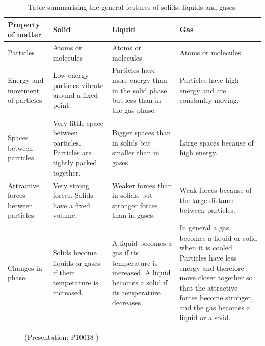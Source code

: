 \begin{table}[h]
\begin{center}
\caption{Table summarising the general features of solids, liquids and gases.}
\label{tab:microscopic:kinetic theory}
\begin{tabular}{|p{3cm}|p{3cm}|p{3cm}|p{3cm}|}\hline
\textbf{Property of matter} & \textbf{Solid} & \textbf{Liquid} & \textbf{Gas} \\\hline
Particles & Atoms or molecules & Atoms or molecules & Atoms or molecules \\\hline
Energy and movement of particles & Low energy - particles vibrate around a fixed point. & Particles have more energy than in the solid phase but less than in the gas phase. & Particles have high energy and are constantly moving.  \\\hline
Spaces between particles & Very little space between particles. Particles are tightly packed together. & Bigger spaces than in solids but smaller than in gases. & Large spaces because of high energy.  \\\hline
Attractive forces between particles. & Very strong forces. Solids have a fixed volume. & Weaker forces than in solids, but stronger forces than in gases. & Weak forces because of the large distance between particles.  \\\hline
Changes in phase. & Solids become liquids or gases if their temperature is increased. & A liquid becomes a gas if its temperature is increased. A liquid becomes a solid if its temperature decreases. & In general a gas becomes a liquid or solid when it is cooled. Particles have less energy and therefore move closer together so that the attractive forces become stronger, and the gas becomes a liquid or a solid.  \\\hline
\end{tabular}
\end{center}
\end{table}
    \par
    \setcounter{subfigure}{0}
	\begin{figure}[H] %
    \label{m38730*slidesharemedia}\label{m38730*slideshareflash} { (Presentation:  P10018 )}
 \end{figure}       \par 
